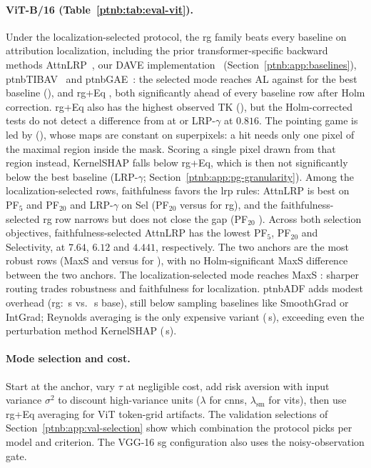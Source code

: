 \paragraph{ViT-B/16 (Table~\ref{ptnb:tab:eval-vit}).}
Under the localization-selected protocol, the \ac{rg} family beats every baseline on attribution
localization, including the prior transformer-specific backward methods
AttnLRP~\parencite{Achtibat2024AttnLRP}, our DAVE implementation~\parencite{Wrobel2024} (Section~\ref{ptnb:app:baselines}),
\ac{ptnbTIBAV}~\parencite{Chefer2021GenericAttention} and \ac{ptnbGAE}~\parencite{Chefer2021ICCV}: the selected mode
reaches AL \vitRGlocAL{} against \vitBestBaseAL{} for the best baseline (\vitBestBaseALname), and
\ac{rg}+Eq \vitRGEqlocAL{}, both significantly ahead of every baseline row after Holm correction.
\ac{rg}+Eq also has the highest observed TK (\vitRGEqlocTK{}), but the Holm-corrected tests do not detect a difference from \vitBestBaseTKname{}
at \vitBestBaseTK{} or LRP-$\gamma$ at $0.816$. The pointing game is led by \vitBestBasePGname{} (\vitBestBasePG{}), whose
maps are constant on superpixels: a hit needs only one pixel of the maximal region inside the mask.
Scoring a single pixel drawn from that region instead, KernelSHAP falls below \ac{rg}+Eq, which is
then not significantly below the best baseline (LRP-$\gamma$; Section~\ref{ptnb:app:pg-granularity}).
Among the localization-selected rows, faithfulness favors the \ac{lrp} rules: AttnLRP is best on PF$_5$ and PF$_{20}$ and LRP-$\gamma$ on
Sel (PF$_{20}$ \vitBestBasePFtwenty{} versus \vitRGlocPFtwenty{} for \ac{rg}), and the
faithfulness-selected \ac{rg} row narrows but does not close the gap (PF$_{20}$
\vitRGfaithPFtwenty{}). Across both selection objectives, faithfulness-selected AttnLRP has the lowest PF$_5$, PF$_{20}$ and Selectivity, at $7.64$, $6.12$ and $4.441$, respectively. The two anchors are the most robust rows (MaxS \vitRGanchorMaxS{} and
\vitRGEqanchorMaxS{} versus \vitBestBaseMaxS{} for \vitBestBaseMaxSname{}), with no Holm-significant MaxS difference between the two anchors. The
localization-selected mode reaches MaxS \vitRGlocMaxS{}: sharper routing trades robustness and
faithfulness for localization. \ac{ptnbADF} adds modest overhead (\ac{rg}: \vitRGlocTime\,s vs.\
\vitRGanchorTime\,s base), still below sampling baselines like SmoothGrad or IntGrad; Reynolds
averaging is the only expensive variant (\vitRGEqTime\,s), exceeding even the perturbation method
KernelSHAP (\vitSHAPTime\,s).

\paragraph{Mode selection and cost.}
Start at the anchor, vary $\tau$ at negligible cost, add risk aversion with input variance $\sigma^2$ to discount high-variance units ($\lambda$ for \acp{cnn}, $\lambda_{\mathrm{sm}}$ for \acp{vit}), then use \ac{rg}+Eq averaging for ViT token-grid artifacts. The validation selections of Section~\ref{ptnb:app:val-selection} show which combination the protocol picks per model and criterion. The VGG-16 \ac{sg} configuration also uses the noisy-observation gate.


